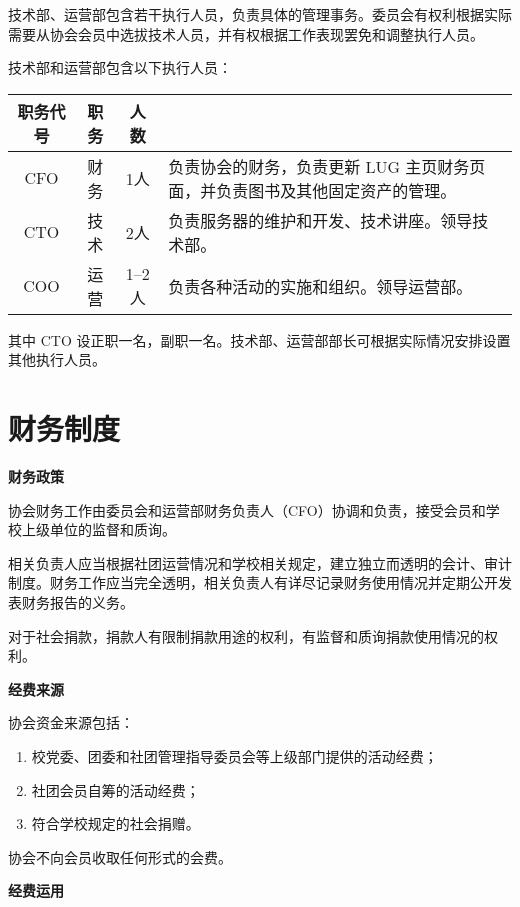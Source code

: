 	技术部、运营部包含若干执行人员，负责具体的管理事务。委员会有权利根据实际需要从协会会员中选拔技术人员，并有权根据工作表现罢免和调整执行人员。
	
	技术部和运营部包含以下执行人员：
	
	\begin{table}[H]
		\centering
		\begin{tabularx}{\textwidth}{cccX}
			\toprule
			\textbf{职务代号} & \textbf{职务} & \textbf{人数} & \centercell{\textbf{职责}} \\
			\midrule
			CFO & 财务 & 1人 & 负责协会的财务，负责更新 LUG 主页财务页面，并负责图书及其他固定资产的管理。 \\
			CTO & 技术 & 2人 & 负责服务器的维护和开发、技术讲座。领导技术部。 \\
			COO & 运营 & 1--2人 & 负责各种活动的实施和组织。领导运营部。\\
			\bottomrule
		\end{tabularx}
	\end{table}
	
	其中 CTO 设正职一名，副职一名。技术部、运营部部长可根据实际情况安排设置其他执行人员。
	
	\section{财务制度}
	
	\term \textbf{财务政策}
	
	协会财务工作由委员会和运营部财务负责人（CFO）协调和负责，接受会员和学校上级单位的监督和质询。
	
	相关负责人应当根据社团运营情况和学校相关规定，建立独立而透明的会计、审计制度。财务工作应当完全透明，相关负责人有详尽记录财务使用情况并定期公开发表财务报告的义务。
	
	对于社会捐款，捐款人有限制捐款用途的权利，有监督和质询捐款使用情况的权利。
	
	\term \textbf{经费来源}
	
	协会资金来源包括：
	
	\begin{enumerate}
		\item 校党委、团委和社团管理指导委员会等上级部门提供的活动经费；
		\item 社团会员自筹的活动经费；
		\item 符合学校规定的社会捐赠。
	\end{enumerate}
	
	协会不向会员收取任何形式的会费。
	
	\term \textbf{经费运用}
	
